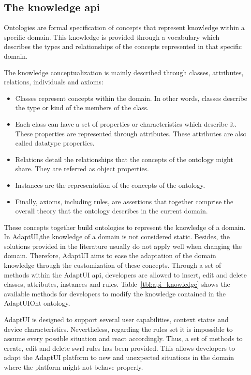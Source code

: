 \subsection{The knowledge \ac{api}}
\label{sec:knowledge_api}

Ontologies are formal specification of concepts that represent knowledge within
a specific domain. This knowledge is provided through a vocabulary which describes
the types and relationships of the concepts represented in that specific domain.

The knowledge conceptualization is mainly described through classes, attributes,
relations, individuals and axioms: 

\begin{itemize}
  \item Classes represent concepts within the domain. In other words, classes
  describe the type or kind of the members of the class.
  
  \item Each class can have a set of properties or characteristics which describe
  it. These properties are represented through attributes. These attributes
  are also called datatype properties.
  
  \item Relations detail the relationships that the concepts of the ontology
  might share. They are referred as object properties.
  \item Instances are the representation of the concepts of the
  ontology.
  
  \item Finally, axioms, including rules, are assertions that together comprise
  the overall theory that the ontology describes in the current domain.
\end{itemize}

These concepts together build ontologies to represent the knowledge of a domain.
In AdaptUI,the knowledge of a domain is not considered static. Besides, the 
solutions provided in the literature usually do not apply well when changing 
the domain. Therefore, AdaptUI aims to ease the adaptation of the domain 
knowledge through the customization of these concepts. Through a set of methods 
within the AdaptUI \ac{api}, developers are allowed to insert, edit and delete 
classes, attributes, instances and rules. Table~\ref{tbl:api_knowledge} shows 
the available methods for developers to modify the knowledge contained in the 
AdaptUIOnt ontology.

AdaptUI is designed to support several user capabilities, context status and
device characteristics. Nevertheless, regarding the rules set it is impossible
to assume every possible situation and react accordingly. Thus, a set of methods
to create, edit and delete \ac{swrl} rules has been provided. This allows 
developers to adapt the AdaptUI platform to new and unexpected situations in the 
domain where the platform might not behave properly.

